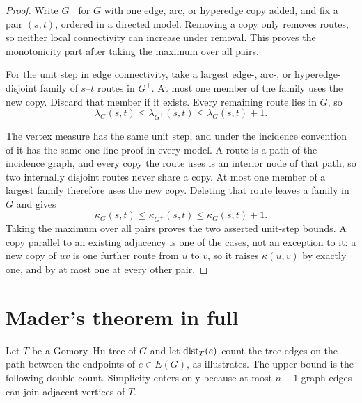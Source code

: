 \begin{proof}
Write $G^+$ for $G$ with one edge, arc, or hyperedge copy added, and fix a pair $(s,t)$, ordered in a directed model. Removing a copy only removes routes, so neither local connectivity can increase under removal. This proves the monotonicity part after taking the maximum over all pairs.

For the unit step in edge connectivity, take a largest edge-, arc-, or hyperedge-disjoint family of $s$--$t$ routes in $G^+$. At most one member of the family uses the new copy. Discard that member if it exists. Every remaining route lies in $G$, so
\[
    \lambda_G(s,t) \le \lambda_{G^+}(s,t) \le \lambda_G(s,t)+1.
\]

The vertex measure has the same unit step, and under the incidence convention of  it has the same one-line proof in every model. A route is a path of the incidence graph, and every copy the route uses is an interior node of that path, so two internally disjoint routes never share a copy. At most one member of a largest family therefore uses the new copy. Deleting that route leaves a family in $G$ and gives
\[
    \kappa_G(s,t) \le \kappa_{G^+}(s,t) \le \kappa_G(s,t)+1.
\]
Taking the maximum over all pairs proves the two asserted unit-step bounds. A copy parallel to an existing adjacency is one of the cases, not an exception to it: a new copy of $uv$ is one further route from $u$ to $v$, so it raises $\kappa(u,v)$ by exactly one, and by at most one at every other pair.
\end{proof}

\section{Mader's theorem in full}\label{sec:mader-gomory-hu}

Let $T$ be a Gomory--Hu tree of $G$ and let $\operatorname{dist}_T(e)$ count the tree edges on the path between the endpoints of $e\in E(G)$, as  illustrates. The upper bound is the following double count. Simplicity enters only because at most $n-1$ graph edges can join adjacent vertices of $T$.

